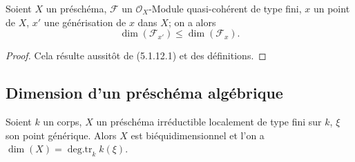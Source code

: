 \begin{proposition}[5.1.13]
\label{IV.2.5.1.13-fr}
Soient $X$ un préschéma, $\mathcal F$ un $\mathcal O_X$-Module
quasi-cohérent de type fini, $x$ un point de $X$, $x'$ une générisation de
$x$ dans $X$; on a alors
\begin{equation}
\dim(\mathcal F_{x'})\leq\dim(\mathcal F_x).
\tag{5.1.13.1}\label{IV.2.5.1.13.1-fr}
\end{equation}
\end{proposition}

\begin{proof}
Cela résulte aussitôt de (5.1.12.1) et des définitions.
\end{proof}

\subsection{Dimension d'un préschéma algébrique}


\begin{proposition}[5.2.1]
\label{IV.2.5.2.1-fr}
Soient $k$ un corps, $X$ un préschéma irréductible localement de type fini sur
$k$, $\xi$ son point générique. Alors $X$ est biéquidimensionnel et l'on a
$\dim(X)=\operatorname{deg.tr}_k k(\xi)$.
\end{proposition}


